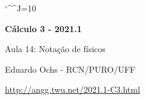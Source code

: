 \documentclass[oneside,12pt]{article}
\begin{document}
\catcode`\^^J=10

\pu

\pu

\long{}
\long{}
\long{}
\long{}
\long{}
\long{}
\long{}
\long{}
\long{}
\long{}
\long{}

\long{}
\long{}

\def\pictgray#1{{\color{GrayPale}\linethickness{0.3pt}#1}}

\def\frown{\ensuremath{{=}{(}}}
\def\True {\mathbf{V}}
\def\False{\mathbf{F}}
\def\D    {\displaystyle}

\def\drafturl{http://angg.twu.net/LATEX/2021-1-C3.pdf}
\def\drafturl{http://angg.twu.net/2021.1-C3.html}
\def\draftfooter{\tiny \href{\drafturl}{\jobname{}} \ColorBrown{\shorttoday{} \hours}}



%

\thispagestyle{empty}

\begin{center}

\vspace*{1.2cm}

{\bf \Large Cálculo 3 - 2021.1}

\bsk

Aula 14: Notação de físicos

\bsk

Eduardo Ochs - RCN/PURO/UFF

\url{http://angg.twu.net/2021.1-C3.html}

\end{center}
\end{document}
